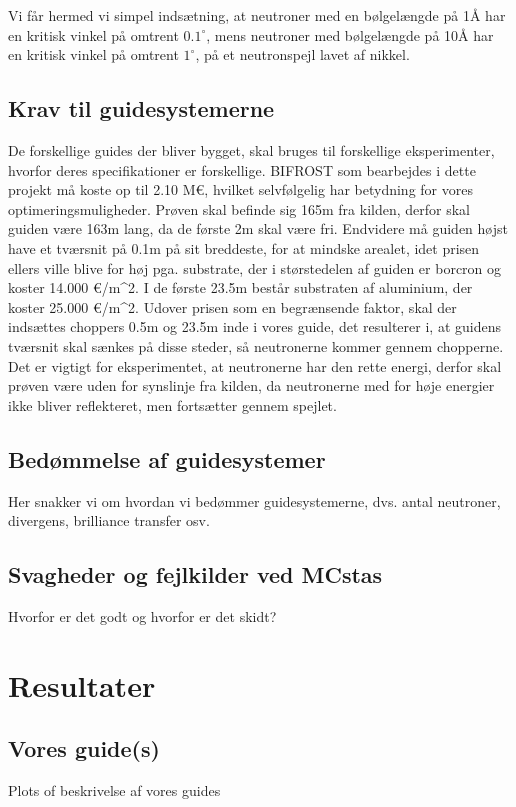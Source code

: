 \documentclass[12pt,oneside,a4paper]{article}
\begin{document}
{{{{{Vi får hermed vi simpel indsætning, at neutroner med en bølgelængde på 1Å har en kritisk vinkel på omtrent $0.1^∘$, mens neutroner med bølgelængde på 10Å har en kritisk vinkel på omtrent $1^∘$, på et neutronspejl lavet af nikkel.

\subsection{Krav til guidesystemerne}
De forskellige guides der bliver bygget, skal bruges til forskellige eksperimenter, hvorfor deres specifikationer er forskellige. BIFROST som bearbejdes i dette projekt må koste op til 2.10 M€, hvilket selvfølgelig har betydning for vores optimeringsmuligheder. Prøven skal befinde sig 165m fra kilden, derfor skal guiden være 163m lang, da de første 2m skal være fri. Endvidere må guiden højst have et tværsnit på 0.1m på sit breddeste, for at mindske arealet, idet prisen ellers ville blive for høj pga. substrate, der i størstedelen af guiden er borcron og koster 14.000 €/m^2. I de første 23.5m består substraten af aluminium, der koster 25.000 €/m^2. Udover prisen som en begrænsende faktor, skal der indsættes choppers 0.5m og 23.5m inde i vores guide, det resulterer i, at guidens tværsnit skal sænkes på disse steder, så neutronerne kommer gennem chopperne. Det er vigtigt for eksperimentet, at neutronerne har den rette energi, derfor skal prøven være uden for synslinje fra kilden, da neutronerne med for høje energier ikke bliver reflekteret, men fortsætter gennem spejlet.

\subsection{Bedømmelse af guidesystemer}
Her snakker vi om hvordan vi bedømmer guidesystemerne, dvs. antal neutroner, divergens, brilliance transfer osv.

\subsection{Svagheder og fejlkilder ved MCstas}
Hvorfor er det godt og hvorfor er det skidt?



\section{Resultater}

\subsection{Vores guide(s)}
Plots of beskrivelse af vores guides



}}}}}
\end{document}
